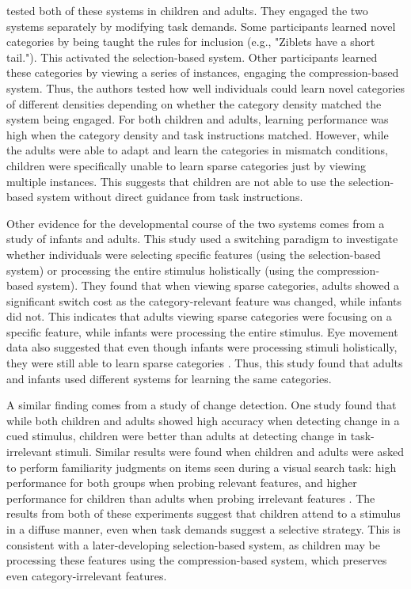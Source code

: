 \documentclass[../dissertation.tex]{subfiles}
\begin{document}
	\citet{Kloos2008} tested both of these systems in children and adults. They engaged the two systems separately by modifying task demands. Some participants learned novel categories by being taught the rules for inclusion (e.g., "Ziblets have a short tail."). This activated the selection-based system. Other participants learned these categories by viewing a series of instances, engaging the compression-based system. Thus, the authors tested how well individuals could learn novel categories of different densities depending on whether the category density matched the system being engaged. For both children and adults, learning performance was high when the category density and task instructions matched. However, while the adults were able to adapt and learn the categories in mismatch conditions, children were specifically unable to learn sparse categories just by viewing multiple instances. This suggests that children are not able to use the selection-based system without direct guidance from task instructions. \par
	Other evidence for the developmental course of the two systems comes from a study of infants and adults. This study used a switching paradigm to investigate whether individuals were selecting specific features (using the selection-based system) or processing the entire stimulus holistically (using the compression-based system). They found that when viewing sparse categories, adults showed a significant switch cost as the category-relevant feature was changed, while infants did not. This indicates that adults viewing sparse categories were focusing on a specific feature, while infants were processing the entire stimulus. Eye movement data also suggested that even though infants were processing stimuli holistically, they were still able to learn sparse categories \citep{Best2013}. Thus, this study found that adults and infants used different systems for learning the same categories. \par
	A similar finding comes from a study of change detection. One study found that while both children and adults showed high accuracy when detecting change in a cued stimulus, children were better than adults at detecting change in task-irrelevant stimuli. Similar results were found when children and adults were asked to perform familiarity judgments on items seen during a visual search task: high performance for both groups when probing relevant features, and higher performance for children than adults when probing irrelevant features \citep{Plebanek2017}. The results from both of these experiments suggest that children attend to a stimulus in a diffuse manner, even when task demands suggest a selective strategy. This is consistent with a later-developing selection-based system, as children may be processing these features using the compression-based system, which preserves even category-irrelevant features. \par
\end{document}
